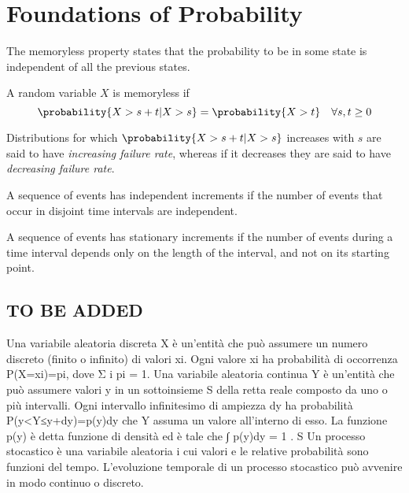 \section{Foundations of Probability}
\label{sec:probability-foundations}

The memoryless property states that the probability to be in some state is independent of all the previous states.

\begin{definition}
	\label{def:memoryless-property}
	A random variable $X$ is memoryless if
	\begin{equation}
	\label{eqn:memoryless-property}
		\probability{X > s+t | X > s} = \probability{X > t} \quad \forall s,t \geq 0
	\end{equation}
\end{definition}

Distributions for which $\probability{X > s+t | X > s}$ increases with $s$ are said to have \textit{increasing failure rate}, whereas if it decreases they are said to have \textit{decreasing failure rate}.

\begin{definition}
	A sequence of events has independent increments if the number of events that occur in disjoint time intervals are independent.
\end{definition}

\begin{definition}
	A sequence of events has stationary increments if the number of events during a time interval depends only on the length of the interval, and not on its starting point.
\end{definition}


\subsection{TO BE ADDED}

Una variabile aleatoria discreta X è un’entità che può assumere un numero discreto (finito o
infinito) di valori xi. Ogni valore xi ha probabilità di occorrenza P(X=xi)=pi, dove Σ i pi = 1.
Una variabile aleatoria continua Y è un’entità che può assumere valori y in un sottoinsieme S della
retta reale composto da uno o più intervalli. Ogni intervallo infinitesimo di ampiezza dy ha
probabilità P(y<Y≤y+dy)=p(y)dy che Y assuma un valore all'interno di esso. La funzione p(y) è
detta funzione di densità ed è tale che ∫ p(y)dy = 1 .
S
Un processo stocastico è una variabile aleatoria i cui valori e le relative probabilità sono funzioni
del tempo. L'evoluzione temporale di un processo stocastico può avvenire in modo continuo o
discreto.